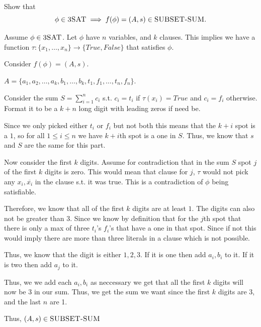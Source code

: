 \documentclass[12pt, letterpaper]{article}
\begin{document}
\begin{subproblem}{}
    Show that
    \[ \phi \in \textsc{3SAT} \implies f(\phi) = (A,s) \in \textsc{SUBSET-SUM}.\]
\end{subproblem}
\begin{problemproof}
    Assume $\phi \in \textsc{3SAT}$. Let $\phi$ have $n$ variables, and $k$ clauses. This implies we have a function $\tau :\{x_1,\dots,x_n\} \to \{True, False\}$ that satisfies $\phi$.

    Consider $f(\phi)=(A,s)$.

    $A=\{a_1,a_2,\dots,a_k,b_1,\dots,b_k,t_1,f_1,\dots,t_n,f_n\}$.

    Consider the sum $S=\displaystyle\sum_{i = 1}^n c_i$ s.t. $c_i=t_i$ if $\tau(x_i)=True$ and $c_i=f_i$ otherwise. Format it to be a $k+n$ long digit with leading zeros if need be.

    Since we only picked either $t_i$ or $f_i$ but not both this means that the $k+i$ spot is a $1$, so for all $1 \leq i \leq n$ we have $k+i$th spot is a one in $S$. Thus, we know that $s$ and $S$ are the same for this part.

    Now consider the first $k$ digits. Assume for contradiction that in the sum $S$ spot $j$ of the first $k$ digits is zero. This would mean that clause for $j$, $\tau$ would not pick any $x_i, \overline{x_i}$ in the clause s.t. it was true. This is a contradiction of $\phi$ being satisfiable.

    Therefore, we know that all of the first $k$ digits are at least $1$. The digits can also not be greater than $3$. Since we know by definition that for the $j$th spot that there is only a max of three $t_i$'s $f_i$'s that have a one in that spot. Since if not this would imply there are more than three literals in a clause which is not possible.

    Thus, we know that the digit is either $1,2,3$. If it is one then add $a_i,b_i$ to it. If it is two then add $a_j$ to it.

    Thus, we we add each $a_i,b_i$ as neccessary we get that all the first $k$ digits will now be $3$ in our sum. Thus, we get the sum we want since the first $k$ digits are 3, and the last $n$ are 1.

    Thus, $(A,s) \in \textsc{SUBSET-SUM}$
\end{problemproof}
\end{document}
